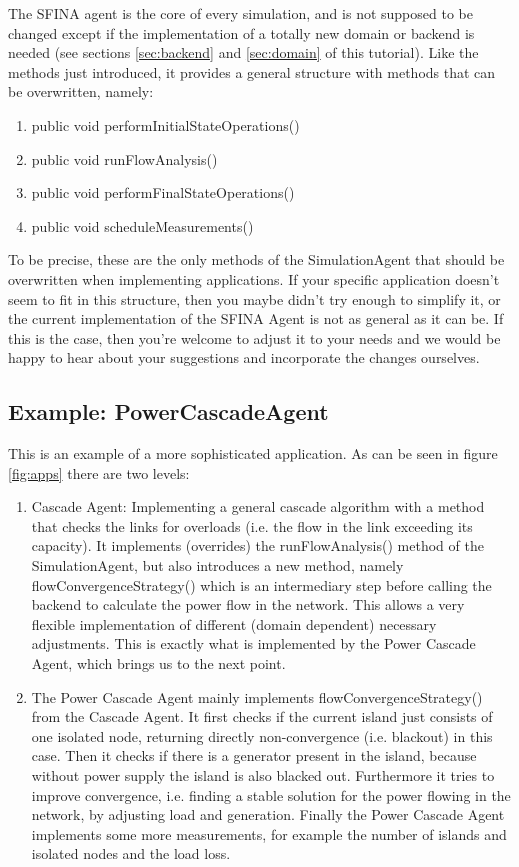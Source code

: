 \documentclass[11pt,fleqn]{book} %
\begin{document}
The SFINA agent is the core of every simulation, and is not supposed to be changed except if the implementation of a totally new domain or backend is needed (see sections \ref{sec:backend} and \ref{sec:domain} of this tutorial). Like the methods just introduced, it provides a general structure with methods that can be overwritten, namely:
\begin{enumerate}
	\item public void performInitialStateOperations()
	\item public void runFlowAnalysis()
	\item public void performFinalStateOperations()
	\item public void scheduleMeasurements()
\end{enumerate}

To be precise, these are the only methods of the SimulationAgent that should be overwritten when implementing applications. If your specific application doesn’t seem to fit in this structure, then you maybe didn’t try enough to simplify it, or the current implementation of the SFINA Agent is not as general as it can be. If this is the case, then you’re welcome to adjust it to your needs and we would be happy to hear about your suggestions and incorporate the changes ourselves.

\subsection{Example: PowerCascadeAgent}
This is an example of a more sophisticated application. As can be seen in figure \ref{fig:apps} there are two levels:
\begin{enumerate}
	\item Cascade Agent: Implementing a general cascade algorithm with a method that checks the links for overloads (i.e. the flow in the link exceeding its capacity). It implements (overrides) the runFlowAnalysis() method of the SimulationAgent, but also introduces a new method, namely flowConvergenceStrategy() which is an intermediary step before calling the backend to calculate the power flow in the network. This allows a very flexible implementation of different (domain dependent) necessary adjustments. This is exactly what is implemented by the Power Cascade Agent, which brings us to the next point.
	\item The Power Cascade Agent mainly implements flowConvergenceStrategy() from the Cascade Agent. It first checks if the current island just consists of one isolated node, returning directly non-convergence (i.e. blackout) in this case. Then it checks if there is a generator present in the island, because without power supply the island is also blacked out. Furthermore it tries to improve convergence, i.e. finding a stable solution for the power flowing in the network, by adjusting load and generation. Finally the Power Cascade Agent implements some more measurements, for example the number of islands and isolated nodes and the load loss.
\end{enumerate}
\end{document}
